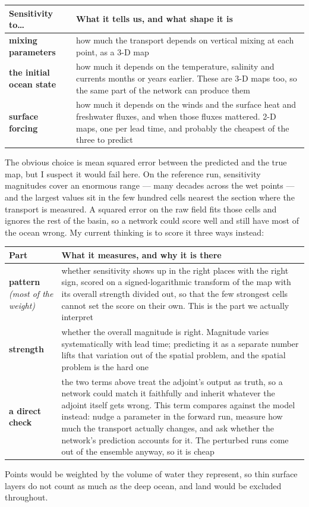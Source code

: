 \smallskip
\begin{tabularx}{\textwidth}{@{}Y{0.58}Y{1.42}@{}}
\toprule
\textbf{Sensitivity to\ldots} & \textbf{What it tells us, and what shape it is}\\
\midrule
\textbf{mixing parameters}
  & how much the transport depends on vertical mixing at each point, as a 3-D map\\
\textbf{the initial ocean state}
  & how much it depends on the temperature, salinity and currents months or years
    earlier. These are 3-D maps too, so the same part of the network can produce them\\
\textbf{surface forcing}
  & how much it depends on the winds and the surface heat and freshwater fluxes, and
    when those fluxes mattered. 2-D maps, one per lead time, and probably the cheapest
    of the three to predict\\
\bottomrule
\end{tabularx}

The obvious choice is mean squared error between the predicted and the true map, but I
suspect it would fail here. On the reference run, sensitivity magnitudes cover an enormous
range --- many decades across the wet points --- and the largest values sit in the few
hundred cells nearest the section where the transport is measured. A squared error on the
raw field fits those cells and ignores the rest of the basin, so a network could score well
and still have most of the ocean wrong. My current thinking is to score it three ways
instead:

\smallskip
\begin{tabularx}{\textwidth}{@{}Y{0.52}Y{1.48}@{}}
\toprule
\textbf{Part} & \textbf{What it measures, and why it is there}\\
\midrule
\textbf{pattern} \emph{(most of the weight)}
  & whether sensitivity shows up in the right places with the right sign, scored on a
    signed-logarithmic transform of the map with its overall strength divided out, so that
    the few strongest cells cannot set the score on their own. This is the part we
    actually interpret\\
\textbf{strength}
  & whether the overall magnitude is right. Magnitude varies systematically with lead
    time; predicting it as a separate number lifts that variation out of the spatial
    problem, and the spatial problem is the hard one\\
\textbf{a direct check}
  & the two terms above treat the adjoint's output as truth, so a network could match it
    faithfully and inherit whatever the adjoint itself gets wrong. This term compares
    against the model instead: nudge a parameter in the forward run, measure how much the
    transport actually changes, and ask whether the network's prediction accounts for it.
    The perturbed runs come out of the ensemble anyway, so it is cheap\\
\bottomrule
\end{tabularx}

\smallskip
Points would be weighted by the volume of water they represent, so thin surface layers
do not count as much as the deep ocean, and land would be excluded throughout.
